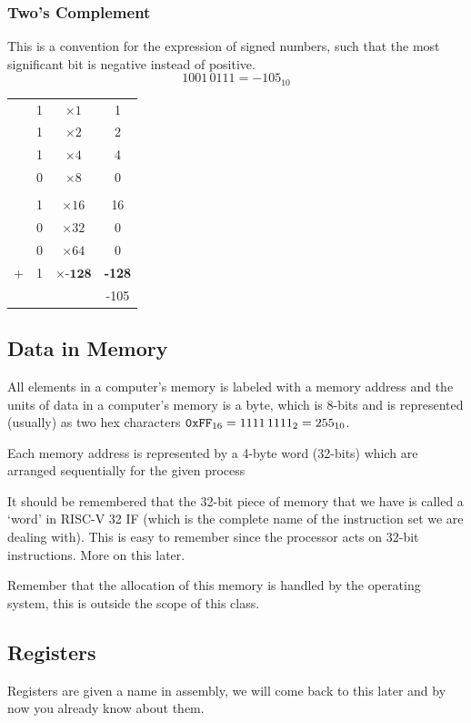 \documentclass{article}
\begin{document}
	\subsubsection{Two's Complement}
	This is a convention for the expression of signed numbers, such that the most significant bit is negative instead of positive.
	\begin{equation}
		1001\,0111 = -105_{10}
	\end{equation}
\begin{center}
\begin{tabular}{c c c c}
&1 & $\times 1$& 1\\
&1 & $\times 2$& 2\\
&1 & $\times 4$& 4\\
&0 & $\times 8$& 0\\
&&&\\
&1 & $\times 16$& 16\\
&0 & $\times 32$& 0\\
&0 & $\times 64$& 0\\
+&1 & $\times \textbf{-128}$& \textbf{-128}\\
\hline
& & & -105		 
\end{tabular}
\end{center}
\subsection{Data in Memory}
All elements in a computer's memory is labeled with a memory address and the units of data in a computer's memory is a byte, which is 8-bits and is represented (usually) as two hex characters $\verb|0xFF|_{16} = 1111\,1111_2 = 255_{10}$.

Each memory address is represented by a 4-byte word (32-bits) which are arranged sequentially for the given process

\begin{note}[Word]
	It should be remembered that the 32-bit piece of memory that we have is called a `word' in RISC-V 32 IF (which is the complete name of the instruction set we are dealing with). This is easy to remember since the processor acts on 32-bit instructions. More on this later. 
\end{note}
\begin{note}
	Remember that the allocation of this memory is handled by the operating system, this is outside the scope of this class.
\end{note}
\subsection{Registers}
Registers are given a name in assembly, we will come back to this later and by now you already know about them.
\end{document}
